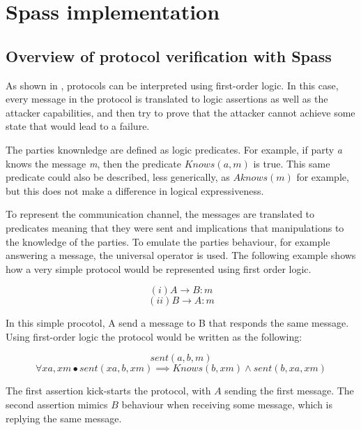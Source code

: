 \documentclass{article}
\begin{document}
	




\section{Spass implementation}
\subsection{Overview of protocol verification with Spass}
	As shown in , 
	protocols can be interpreted using first-order logic. In this case, every message in the protocol
	is translated to logic assertions as well as the attacker capabilities, and then try to prove that the
	attacker cannot achieve some state that would lead to a failure.

	The parties knownledge are defined as logic predicates. For example, if party \emph{a} knows the message
	\emph{m}, then the predicate $Knows(a,m)$ is true. This same predicate could also be described, less 
	generically, as $Aknows(m)$ for example, but this does not make a difference in logical expressiveness.

	To represent the communication channel, the messages are translated to predicates meaning that they were
	sent and implications that manipulations to the knowledge of the parties. To emulate the parties behaviour,
	for example answering a message, the universal operator is used. The following example shows how a very simple
	protocol would be represented using first order logic. 

	$$ (i) A \rightarrow B:m  $$
	$$ (ii) B \rightarrow A:m $$

	In this simple procotol, A send a message to B that responds the same message. Using first-order logic the protocol
	would be written as the following:

	$$ sent(a,b,m) $$
	$$ \forall xa, xm \bullet  sent(xa,b,xm) \implies Knows(b, xm) \land  sent(b, xa, xm)$$

	The first assertion kick-starts the protocol, with $A$ sending the first message. The second assertion mimics $B$ 
	behaviour when receiving some message, which is replying the same message.
\end{document}
